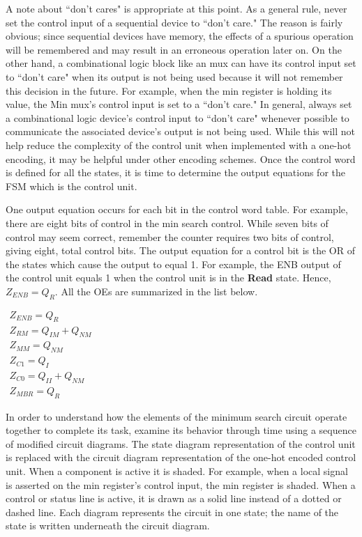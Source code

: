 A note about ``don't cares" is appropriate at this point.  As a general
rule, never set the control input of a sequential device to 
``don't care."  The reason is fairly obvious; since sequential devices 
have memory, the effects of a spurious operation will be remembered
and may result in an erroneous operation later on.  On the other hand, a
combinational logic block like an mux can have its control input set 
to ``don't care" when its output is not being used because it will not
remember this decision in the future.  For example, when the min 
register is holding its value, the Min mux's control input is set 
to a ``don't care."  In general,  always set a combinational
logic device's control input to ``don't care" whenever possible to 
communicate the associated device's output is not being used.  While
this will not help reduce the complexity of the control unit when
implemented with a one-hot encoding, it may be helpful under
other encoding schemes.  Once the control word is defined for all the
states, it is time to determine the output equations for the FSM which
is the control unit.

One output equation occurs for each bit in the control word table.
For example, there are eight bits of control in the min search control.
While seven bits of control may seem correct, remember 
the counter requires two bits of control, giving 
eight, total control bits.  The output equation for a control bit is the
OR of the states which cause the output to equal 1.  For example, the 
ENB output of the control unit equals 1 when the control unit is in the 
\textbf{ Read} state. Hence, $Z_{ENB} = Q_{R}$.  
All the OEs are summarized in the list below.

$\begin{array}{l}
Z_{ENB} = Q_{R} \\
Z_{RM} = Q_{IM}  + Q_{NM} \\
Z_{MM} = Q_{NM} \\
Z_{C1} = Q_{I} \\
Z_{C0} = Q_{II} + Q_{NM} \\
Z_{MBR} = Q_{R} 
\end{array}$


In order to understand how the elements of the minimum search circuit 
operate together to complete its task, examine its 
behavior through time using a sequence of modified circuit 
diagrams.  The state diagram representation of 
the control unit is replaced with the circuit diagram 
representation of the one-hot encoded control unit.  When a 
component is active it is shaded.  For example,
when a local signal is asserted on the min register's control
input, the min register is shaded. When a control
or status line is active, it is drawn as a solid line instead 
of a dotted or dashed line.  Each diagram represents the
circuit in one state; the name of the state is written 
underneath the circuit diagram.

